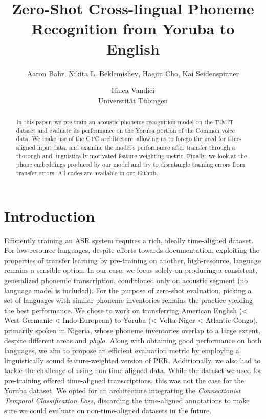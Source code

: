 \documentclass[11pt]{article}
\title{Zero-Shot Cross-lingual Phoneme Recognition from Yoruba to English}
\author{Aaron Bahr, Nikita L. Beklemishev, Haejin Cho, Kai Seidenspinner \and Ilinca Vandici \\
         Universtität Tübingen }
\begin{document}
\maketitle
\outauthor
\begin{abstract}
In this paper, we pre-train an acoustic phoneme recognition model on the TIMIT dataset and evaluate its performance on the Yoruba portion of the Common voice data. We make use of the CTC architecture, allowing us to forego the need for time-aligned input data, and examine the model’s performance after transfer through a thorough and linguistically motivated feature weighting metric. Finally, we look at the phone embeddings produced by our model and try to disentangle training errors from transfer errors. All codes are available in our \href{https://github.com/lilovyjgrib/X-lingual_IPA_ASR}{Github}.
\end{abstract}

\section{Introduction}
Efficiently training an ASR system requires a rich, ideally time-aligned dataset. For low-resource languages, despite efforts towards documentation, exploiting the properties of transfer learning by pre-training on another, high-resource, language remains a sensible option. In our case, we focus solely on producing a consistent, generalized phonemic transcription, conditioned only on acoustic segment (no language model is included). For the purpose of zero-shot evaluation, picking a set of languages with similar phoneme inventories remains the practice yielding the best performance. We chose to work on transferring American English (< West Germanic < Indo-European) to Yoruba (< Volta-Niger < Atlantic-Congo), primarily spoken in Nigeria, whose phoneme inventories overlap to a large extent, despite different areas and \textit{phyla}.
Along with obtaining good performance on both languages, we aim to propose an efficient evaluation metric by employing a linguistically sound feature-weighted version of PER.
Additionally, we also had to tackle the challenge of using non-time-aligned data. While the dataset we used for pre-training offered time-aligned transcriptions, this was not the case for the Yoruba dataset. We opted for an architecture integrating the \textit{Connectionist Temporal Classification Loss}, discarding the time-aligned annotations to make sure we could evaluate on non-time-aligned datasets in the future.
\end{document}
